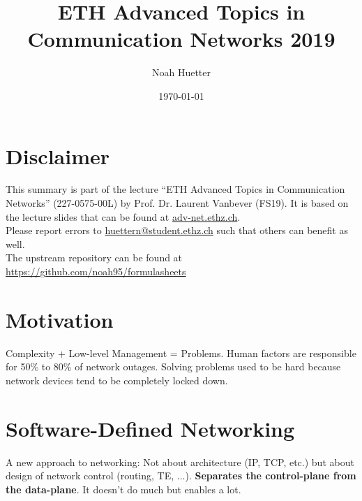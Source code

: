 \documentclass[a4paper, fontsize=8pt, landscape, DIV=1]{scrartcl}
\title{ETH Advanced Topics in Communication Networks 2019}
\author{Noah Huetter}
\date{\today}
\begin{document}
\setcounter{page}{0}
\setcounter{secnumdepth}{2} %
\begin{multicols*}{4}
	\section*{Disclaimer}
	This summary is part of the lecture ``ETH Advanced Topics in Communication Networks'' (227-0575-00L) by Prof. Dr. Laurent Vanbever (FS19). It is based on the lecture slides 
  that can be found at \href{https://adv-net.ethz.ch/}{adv-net.ethz.ch}. \\[6pt]
	Please report errors to \href{mailto:huettern@student.ethz.ch}{huettern@student.ethz.ch} such that others can benefit as well.\\[6pt]	
  The upstream repository can be found at \href{https://github.com/noah95/formulasheets}{https://github.com/noah95/formulasheets}
	\vfill\null
  \columnbreak
  \setcounter{tocdepth}{2}
  \tableofcontents
  \vfill\null
	\pagebreak
  \maketitle 
  \setcounter{page}{1}
  \thispagestyle{fancy}


  \section{Motivation}
  Complexity + Low-level Management = Problems. Human factors are responsible
  for 50\% to 80\% of network outages. Solving problems used to be hard because
  network devices tend to be completely locked down.

  \section{Software-Defined Networking}
  A new approach to networking: Not about architecture (IP, TCP, etc.) but 
  about design of network control (routing, TE, ...). \textbf{Separates the
  control-plane from the data-plane}. It doesn't do much but enables a lot.



\end{multicols*}
\end{document}
